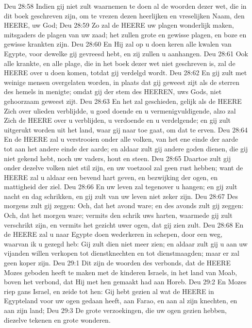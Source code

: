 Deu 28:58  Indien gij niet zult waarnemen te doen al de woorden dezer wet, die in dit boek geschreven zijn, om te vrezen dezen heerlijken en vreselijken Naam, den HEERE, uw God;
Deu 28:59  Zo zal de HEERE uw plagen wonderlijk maken, mitsgaders de plagen van uw zaad; het zullen grote en gewisse plagen, en boze en gewisse krankten zijn.
Deu 28:60  En Hij zal op u doen keren alle kwalen van Egypte, voor dewelke gij gevreesd hebt, en zij zullen u aanhangen.
Deu 28:61  Ook alle krankte, en alle plage, die in het boek dezer wet niet geschreven is, zal de HEERE over u doen komen, totdat gij verdelgd wordt.
Deu 28:62  En gij zult met weinige mensen overgelaten worden, in plaats dat gij geweest zijt als de sterren des hemels in menigte; omdat gij der stem des HEEREN, uws Gods, niet gehoorzaam geweest zijt.
Deu 28:63  En het zal geschieden, gelijk als de HEERE Zich over ulieden verblijdde, u goed doende en u vermenigvuldigende, alzo zal Zich de HEERE over u verblijden, u verdoende en u verdelgende; en gij zult uitgerukt worden uit het land, waar gij naar toe gaat, om dat te erven.
Deu 28:64  En de HEERE zal u verstrooien onder alle volken, van het ene einde der aarde tot aan het andere einde der aarde; en aldaar zult gij andere goden dienen, die gij niet gekend hebt, noch uw vaders, hout en steen.
Deu 28:65  Daartoe zult gij onder dezelve volken niet stil zijn, en uw voetzool zal geen rust hebben; want de HEERE zal u aldaar een bevend hart geven, en bezwijking der ogen, en mattigheid der ziel.
Deu 28:66  En uw leven zal tegenover u hangen; en gij zult nacht en dag schrikken, en gij zult van uw leven niet zeker zijn.
Deu 28:67  Des morgens zult gij zeggen: Och, dat het avond ware; en des avonds zult gij zeggen: Och, dat het morgen ware; vermits den schrik uws harten, waarmede gij zult verschrikt zijn, en vermits het gezicht uwer ogen, dat gij zien zult.
Deu 28:68  En de HEERE zal u naar Egypte doen wederkeren in schepen, door een weg, waarvan ik u gezegd heb: Gij zult dien niet meer zien; en aldaar zult gij u aan uw vijanden willen verkopen tot dienstknechten en tot dienstmaagden; maar er zal geen koper zijn.
Deu 29:1  Dit zijn de woorden des verbonds, dat de HEERE Mozes geboden heeft te maken met de kinderen Israels, in het land van Moab, boven het verbond, dat Hij met hen gemaakt had aan Horeb.
Deu 29:2  En Mozes riep gans Israel, en zeide tot hen: Gij hebt gezien al wat de HEERE in Egypteland voor uw ogen gedaan heeft, aan Farao, en aan al zijn knechten, en aan zijn land;
Deu 29:3  De grote verzoekingen, die uw ogen gezien hebben, diezelve tekenen en grote wonderen.
